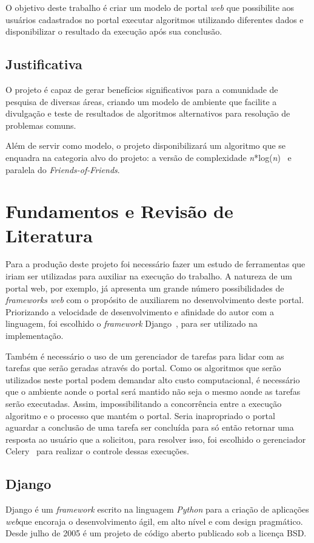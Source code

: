 \documentclass[tg]{mdtufsm}
\begin{document}
O objetivo deste trabalho é criar um modelo de portal \emph{web} que possibilite aos usuários cadastrados no portal executar algoritmos utilizando diferentes dados e disponibilizar o resultado da execução após sua conclusão.

\section{Justificativa}

O projeto é capaz de gerar benefícios significativos para a comunidade de pesquisa de diversas áreas, criando um modelo de ambiente que facilite a divulgação e teste de resultados de algoritmos alternativos para resolução de problemas comuns.

Além de servir como modelo, o projeto disponibilizará um algoritmo que se enquadra na categoria alvo do projeto: a versão de complexidade \emph{n}*log(\emph{n})~ e paralela do \emph{Friends-of-Friends}.



\chapter{Fundamentos e Revisão de Literatura}
Para a produção deste projeto foi necessário fazer um estudo de ferramentas que iriam ser utilizadas para auxiliar na execução do trabalho. A natureza de um portal web, por exemplo, já apresenta um grande número possibilidades de \emph{frameworks} \emph{web} com o propósito de auxiliarem no desenvolvimento deste portal. Priorizando a velocidade de desenvolvimento e afinidade do autor com a linguagem, foi escolhido o \emph{framework} Django~\cite{Django}, para ser utilizado na implementação.

Também é necessário o uso de um gerenciador de tarefas para lidar com as tarefas que serão geradas através do portal. Como os algoritmos que serão utilizados neste portal podem demandar  alto custo computacional, é necessário que o ambiente aonde o portal será mantido não seja o mesmo aonde as tarefas serão executadas. Assim, impossibilitando a concorrência entre a execução algoritmo e o processo que mantém o portal. Seria inapropriado o portal aguardar a conclusão de uma tarefa ser concluída para só então retornar uma resposta ao usuário que a solicitou, para resolver isso, foi escolhido o gerenciador Celery~\cite{Celery} para realizar o controle dessas execuções.

\section{Django}
Django é um \emph{framework} escrito na linguagem \emph{Python} para a criação de aplicações \emph{web}que encoraja o desenvolvimento ágil, em alto nível e com design pragmático. Desde julho de 2005 é um projeto de código aberto publicado sob a licença BSD.
\end{document}
